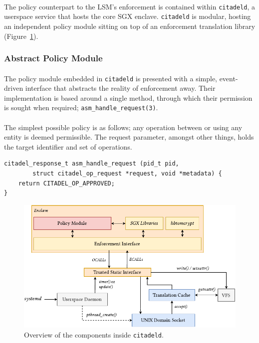 \paragraph{} The policy counterpart to the LSM's enforcement is contained within \texttt{citadeld}, a userspace service that hosts the core SGX enclave. \texttt{citadeld} is modular, hosting an independent policy module sitting on top of an enforcement translation library (Figure~\ref{fig:policy-enclave}).

\subsubsection{Abstract Policy Module}
\paragraph{} The policy module embedded in \texttt{citadeld} is presented with a simple, event-driven interface that abstracts the reality of enforcement away. Their implementation is based around a single method, through which their permission is sought when required; \texttt{asm\_handle\_request(3)}.


\paragraph{} The simplest possible policy is as follows; any operation between or using any entity is deemed permissible. The request parameter, amongst other things, holds the target identifier and set of operations. 

\begin{verbatim}
citadel_response_t asm_handle_request (pid_t pid, 
        struct citadel_op_request *request, void *metadata) {
    return CITADEL_OP_APPROVED;
}
\end{verbatim}

\begin{figure}[]
    \centering
    \includegraphics[width=0.9\linewidth]{figures/EnclaveLayout.pdf}
    \caption{Overview of the components inside \texttt{citadeld}.}
    \label{fig:policy-enclave}
\end{figure}

